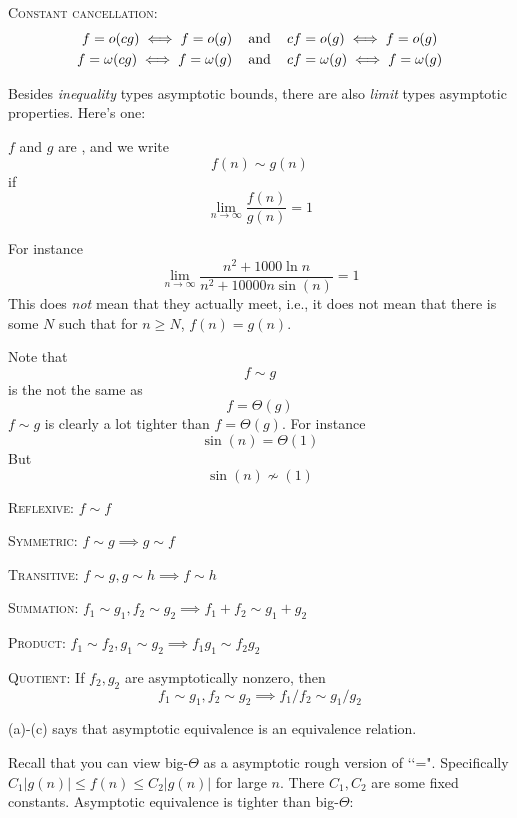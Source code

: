 \begin{cor}
    \textsc{Constant cancellation:}
    \begin{align*}
      f = o(cg) \iff f = o(g)           &\text{ \,\,\, and \,\,\, } cf = o(g) \iff f = o(g) \\
      f = \omega(cg) \iff f = \omega(g) &\text{ \,\,\, and \,\,\, } cf = \omega(g) \iff f = \omega(g)
    \end{align*}
\end{cor}


Besides \textit{inequality} types asymptotic bounds, there are also
\textit{limit} types asymptotic properties.
Here's one:

\begin{defn}
  $f$ and $g$ are ,
  and we write
  \[
  f(n) \sim g(n)
  \]
  if
  \[
  \lim_{n \rightarrow \infty} \frac{f(n)}{g(n)} = 1
  \]
\end{defn}

For instance
\[
\lim_{n \rightarrow \infty} \frac{n^2 + 1000\ln n}{n^2 + 10000n\sin(n)}
= 1
\]
This does \textit{not} mean that they actually meet, i.e., 
it does not mean that there is some $N$ such that 
for $n \geq N$, $f(n) = g(n)$.

Note that
\[
f \sim g
\]
is the not the same as
\[
f = \Theta(g)
\]
$f \sim g$ is clearly a lot tighter than $f = \Theta(g)$.
For instance
\[
\sin(n) = \Theta(1)
\]
But
\[
\sin(n) \not\sim (1)
\]

\begin{prop}
\mbox{}
\begin{myenum}
\item \textsc{Reflexive:} $f \sim f$
\item \textsc{Symmetric:} $f \sim g \implies g \sim f$
\item \textsc{Transitive:} $f \sim g, g \sim h \implies f \sim h$
\item \textsc{Summation:} $f_1 \sim g_1, f_2 \sim g_2
  \implies f_1 + f_2 \sim g_1 + g_2$
\item \textsc{Product:}
  $f_1 \sim f_2, g_1 \sim g_2
  \implies f_1 g_1 \sim f_2 g_2$
\item \textsc{Quotient:}
  If $f_2, g_2$ are asymptotically nonzero, then
  \[
  f_1 \sim g_1, f_2 \sim g_2 \implies f_1/f_2 \sim g_1/g_2
  \]
\end{myenum}
(a)-(c) says that asymptotic equivalence is an equivalence
relation.
\end{prop}

Recall that you can view big-$\Theta$ as a asymptotic rough version
of \lq\lq =".
Specifically $C_1|g(n)| \leq f(n) \leq C_2|g(n)|$ for large $n$.
There $C_1,C_2$ are some fixed constants.
Asymptotic equivalence is tighter than big-$\Theta$:


